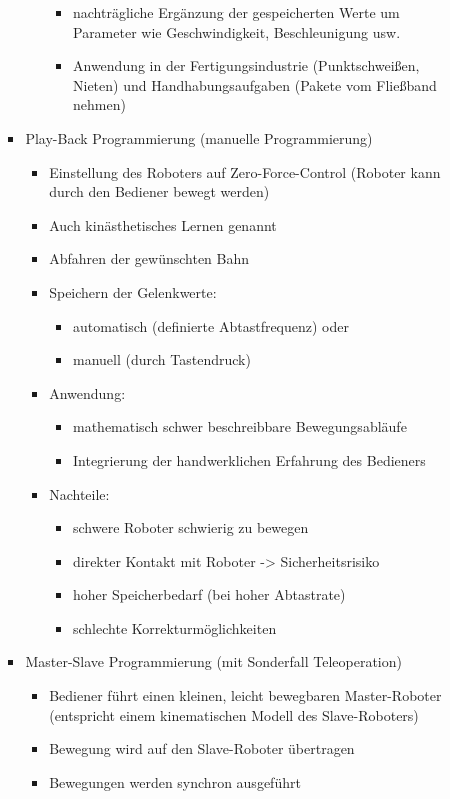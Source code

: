 \documentclass[paper=a4, fontsize=11pt]{scrartcl} %
\numberwithin{equation}{section} %
\numberwithin{figure}{section} %
\numberwithin{table}{section} %
\begin{document}
\begin{enumerate}
\begin{itemize}
\begin{itemize}
\begin{itemize}
\begin{itemize}
\item nachträgliche Ergänzung der gespeicherten Werte um Parameter wie Geschwindigkeit, Beschleunigung usw.
\item Anwendung in der Fertigungsindustrie (Punktschweißen, Nieten) und Handhabungsaufgaben (Pakete vom Fließband nehmen)
\end{itemize}
\end{itemize}
\item Play-Back Programmierung (manuelle Programmierung)
\begin{itemize}
\item Einstellung des Roboters auf Zero-Force-Control (Roboter kann durch den Bediener bewegt werden)
\item Auch kinästhetisches Lernen genannt
\item Abfahren der gewünschten Bahn
\item Speichern der Gelenkwerte:
\begin{itemize}
\item automatisch (definierte Abtastfrequenz) oder
\item manuell (durch Tastendruck)
\end{itemize}
\item Anwendung:
\begin{itemize}
\item mathematisch schwer beschreibbare Bewegungsabläufe
\item Integrierung der handwerklichen Erfahrung des Bedieners
\end{itemize}
\item Nachteile:
\begin{itemize}
\item schwere Roboter schwierig zu bewegen
\item direkter Kontakt mit Roboter -> Sicherheitsrisiko
\item hoher Speicherbedarf (bei hoher Abtastrate)
\item schlechte Korrekturmöglichkeiten
\end{itemize}
\end{itemize}
\item Master-Slave Programmierung (mit Sonderfall Teleoperation)
\begin{itemize}
\item Bediener führt einen kleinen, leicht bewegbaren Master-Roboter (entspricht einem kinematischen Modell des Slave-Roboters)
\item Bewegung wird auf den Slave-Roboter übertragen
\item Bewegungen werden synchron ausgeführt

\end{itemize}
\end{itemize}
\end{itemize}
\end{enumerate}
\end{document}
